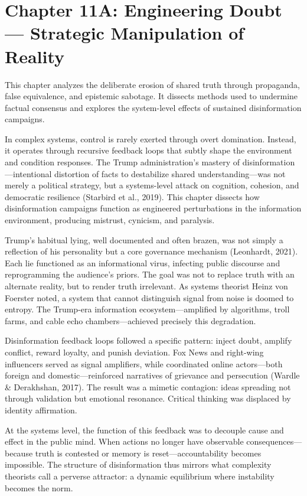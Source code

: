 \documentclass[
]{article}
\author{}
\date{}
\begin{document}
\chapter*{Chapter 11A: Engineering Doubt — Strategic Manipulation of Reality}

\noindent
This chapter analyzes the deliberate erosion of shared truth through propaganda, false equivalence, and epistemic sabotage. It dissects methods used to undermine factual consensus and explores the system-level effects of sustained disinformation campaigns.

In complex systems, control is rarely exerted through overt domination. Instead, it operates through recursive feedback loops that subtly shape the environment and condition responses. The Trump administration's mastery of disinformation---intentional distortion of facts to destabilize shared understanding---was not merely a political strategy, but a systems-level attack on cognition, cohesion, and democratic resilience (Starbird et al., 2019). This chapter dissects how disinformation campaigns function as engineered perturbations in the information environment, producing mistrust, cynicism, and paralysis.

Trump's habitual lying, well documented and often brazen, was not simply a reflection of his personality but a core governance mechanism (Leonhardt, 2021). Each lie functioned as an informational virus, infecting public discourse and reprogramming the audience's priors. The goal was not to replace truth with an alternate reality, but to render truth irrelevant. As systems theorist Heinz von Foerster noted, a system that cannot distinguish signal from noise is doomed to entropy. The Trump-era information ecosystem---amplified by algorithms, troll farms, and cable echo chambers---achieved precisely this degradation.

Disinformation feedback loops followed a specific pattern: inject doubt, amplify conflict, reward loyalty, and punish deviation. Fox News and right-wing influencers served as signal amplifiers, while coordinated online actors---both foreign and domestic---reinforced narratives of grievance and persecution (Wardle \& Derakhshan, 2017). The result was a mimetic contagion: ideas spreading not through validation but emotional resonance. Critical thinking was displaced by identity affirmation.

At the systems level, the function of this feedback was to decouple cause and effect in the public mind. When actions no longer have observable consequences---because truth is contested or memory is reset---accountability becomes impossible. The structure of disinformation thus mirrors what complexity theorists call a perverse attractor: a dynamic equilibrium where instability becomes the norm.
\end{document}
